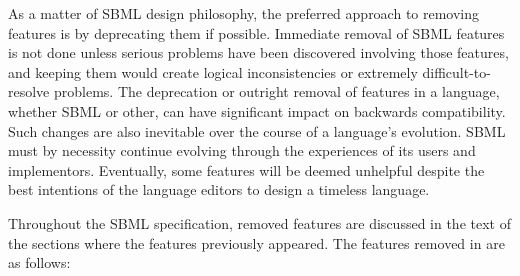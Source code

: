 As a matter of SBML design philosophy, the preferred approach to
removing features is by deprecating them if possible.  Immediate
removal of SBML features is not done unless serious problems have
been discovered involving those features, and keeping them would
create logical inconsistencies or extremely difficult-to-resolve
problems.  The deprecation or outright removal of features in a
language, whether SBML or other, can have significant impact on
backwards compatibility.  Such changes are also inevitable over
the course of a language's evolution.  SBML must by necessity
continue evolving through the experiences of its users and
implementors.  Eventually, some features will be deemed unhelpful
despite the best intentions of the language editors to design a
timeless language.

Throughout the SBML specification, removed features are discussed
in the text of the sections where the features previously appeared.
The features removed in \changed{\sbmltwothree} are as follows:
